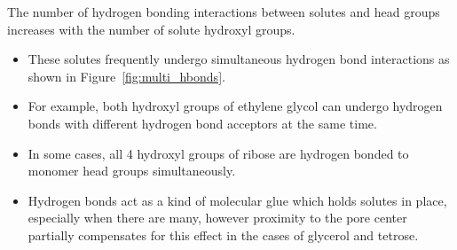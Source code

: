 \documentclass{article}
\begin{document}
  The number of hydrogen bonding interactions between solutes and head groups
  increases with the number of solute hydroxyl groups.
  \begin{itemize}
    \item These solutes frequently undergo simultaneous hydrogen bond interactions as
    shown in Figure~\ref{fig:multi_hbonds}. 
    \item For example, both hydroxyl groups of ethylene glycol can undergo hydrogen
    bonds with different hydrogen bond acceptors at the same time.
    \item In some cases, all 4 hydroxyl groups of ribose are hydrogen bonded to monomer
    head groups simultaneously.
    \item Hydrogen bonds act as a kind of molecular glue which holds solutes in place, 
    especially when there are many, however proximity to the pore center partially 
    compensates for this effect in the cases of glycerol and tetrose.
  \end{itemize}
  
\end{document}
